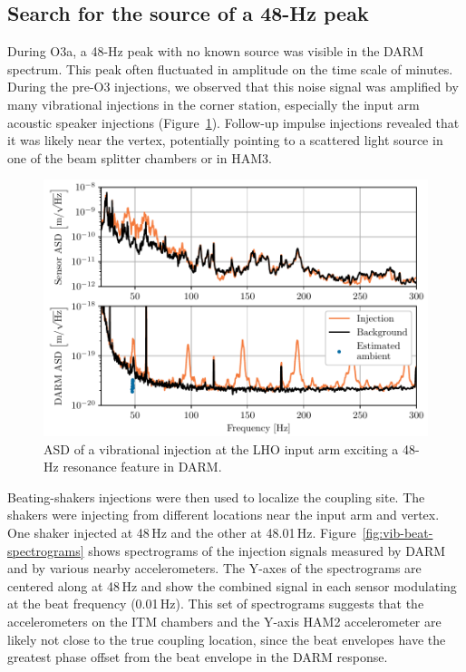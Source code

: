 \subsection{Search for the source of a 48-Hz peak}\label{sec:vib-48hz}

During O3a, a 48-Hz peak with no known source was visible in the DARM spectrum.
This peak often fluctuated in amplitude on the time scale of minutes.
During the pre-O3 injections, we observed that this noise signal was amplified by many vibrational injections in the corner station, especially the input arm acoustic speaker injections (Figure~\ref{fig:vib-48hz-injection}).
Follow-up impulse injections revealed that it was likely near the vertex, potentially pointing to a scattered light source in one of the beam splitter chambers or in HAM3.

\begin{figure}[htb]
	\centering
	\includegraphics[width=\textwidth]{figures/noise-studies/vib-48hz-injection.pdf}
	\caption{
		ASD of a vibrational injection at the LHO input arm exciting a 48-Hz resonance feature in DARM.}
	\label{fig:vib-48hz-injection}
\end{figure}

Beating-shakers injections were then used to localize the coupling site.
The shakers were injecting from different locations near the input arm and vertex.
One shaker injected at 48\,Hz and the other at 48.01\,Hz.
Figure~\ref{fig:vib-beat-spectrograms} shows spectrograms of the injection signals measured by DARM and by various nearby accelerometers.
The Y-axes of the spectrograms are centered along at 48\,Hz and show the combined signal in each sensor modulating at the beat frequency (0.01\,Hz).
This set of spectrograms suggests that the accelerometers on the \ac{ITM} chambers and the Y-axis HAM2 accelerometer are likely not close to the true coupling location, since the beat envelopes have the greatest phase offset from the beat envelope in the \ac{DARM} response.

